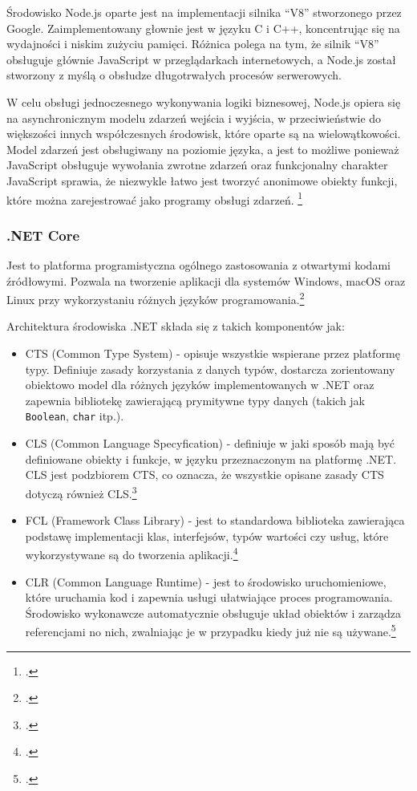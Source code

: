 \documentclass[a4paper]{article}
\begin{document}
\par Środowisko Node.js oparte jest na implementacji silnika ``V8'' stworzonego przez Google. Zaimplementowany głownie jest w języku C i C++, koncentrując się na wydajności i niskim zużyciu pamięci. Różnica polega na tym, że silnik ``V8'' obsługuje głównie JavaScript w przeglądarkach internetowych, a Node.js został stworzony z myślą o obsłudze długotrwałych procesów serwerowych.
\par W celu obsługi jednoczesnego wykonywania logiki biznesowej, Node.js opiera się na asynchronicznym modelu zdarzeń wejścia i wyjścia, w przeciwieństwie do większości innych współczesnych środowisk, które oparte są na wielowątkowości. Model zdarzeń jest obsługiwany na poziomie języka, a jest to możliwe ponieważ JavaScript obsługuje wywołania zwrotne zdarzeń oraz funkcjonalny charakter JavaScript sprawia, że niezwykle łatwo jest tworzyć anonimowe obiekty funkcji, które można zarejestrować jako programy obsługi zdarzeń. \footcite{Tilkov2010}

\subsubsection{.NET Core}

\par Jest to platforma programistyczna ogólnego zastosowania z otwartymi kodami źródłowymi. Pozwala na tworzenie aplikacji dla systemów Windows, macOS oraz Linux przy wykorzystaniu różnych języków programowania.\footcite{dotNetvsFramework}
\par Architektura środowiska .NET składa się z takich komponentów jak:
\begin{itemize}
  \item CTS (Common Type System) - opisuje wszystkie wspierane przez platformę typy. Definiuje zasady korzystania z danych typów, dostarcza zorientowany obiektowo model dla różnych języków implementowanych w .NET oraz zapewnia bibliotekę zawierającą prymitywne typy danych (takich jak \texttt{Boolean}, \texttt{char} itp.).
  \item CLS (Common Language Specyfication) - definiuje w jaki sposób mają być definiowane obiekty i funkcje, w języku przeznaczonym na platformę .NET. CLS jest podzbiorem CTS, co oznacza, że wszystkie opisane zasady CTS dotyczą również CLS.\footcite{dotNetCLS}
  \item FCL (Framework Class Library) - jest to standardowa biblioteka zawierająca podstawę implementacji klas, interfejsów, typów wartości czy usług, które wykorzystywane są do tworzenia aplikacji.\footcite{dotNetFCL}
  \item CLR (Common Language Runtime) - jest to środowisko uruchomieniowe, które uruchamia kod i zapewnia usługi ułatwiające proces programowania. Środowisko wykonawcze automatycznie obsługuje układ obiektów i zarządza referencjami no nich, zwalniając je w przypadku kiedy już nie są używane.\footcite{dotNetCLR}
  
\end{itemize}
\end{document}
